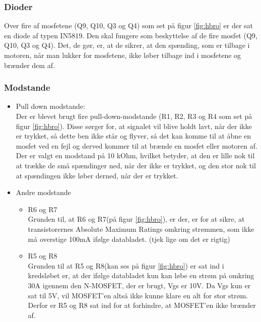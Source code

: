 \subsubsection{Dioder}
Over fire af mosfetene (Q9, Q10, Q3 og Q4) som set på figur \ref{fig:hbro} er der sat en diode af typen IN5819. Den skal fungere som beskyttelse af de fire mosfet (Q9, Q10, Q3 og Q4). Det, de gør, er, at de sikrer, at den spænding, som er tilbage i motoren, når man lukker for mosfetene, ikke løber tilbage ind i mosfetene og brænder dem af.

\subsubsection{Modstande}
\begin{itemize}
	\item Pull down modstande:\\
	Der er blevet brugt fire pull-down-modstande (R1, R2, R3 og R4 som set på figur \ref{fig:hbro}). Disse sørger for, at signalet vil blive holdt lavt, når der ikke er trykket, så dette ben ikke står og flyver, så det kan komme til at åbne en mosfet ved en fejl og derved kommer til at brænde en mosfet eller motoren af. Der er valgt en modstand på 10 kOhm, hvilket betyder, at den er lille nok til at trække de små spændinger ned, når der ikke er trykket, og den stor nok til at spændingen ikke løber derned, når der er trykket. 
	\item Andre modstande
	\begin{itemize}
		\item R6 og R7\\
			Grunden til, at R6 og R7(på figur \ref{fig:hbro}), er der, er for at sikre, at transistorernes Absolute Maximum Ratings omkring strømmen, som ikke må overstige 100mA ifølge databladet. (tjek lige om det er rigtig)
		\item R5 og R8\\
			Grunden til at R5 og R8(kan ses på figur \ref{fig:hbro}) er sat ind i kredsløbet er, at der ifølge databladet kun kan løbe en strøm på omkring 30A igennem den N-MOSFET, der er brugt, Vgs er 10V. Da Vgs kun er sat til 5V, vil MOSFET'en altså ikke kunne klare en alt for stor strøm. Derfor er R5 og R8 sat ind for at forhindre, at MOSFET'en ikke brænder af. 
	\end{itemize}

\end{itemize}

